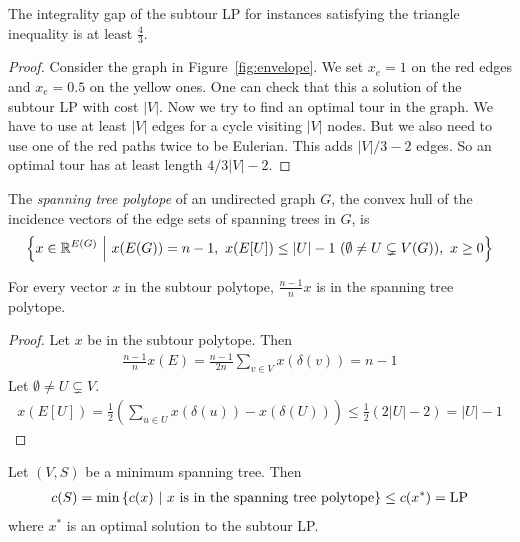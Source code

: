 \documentclass{skript}
\begin{document}
\begin{prop}
    The integrality gap of the subtour LP for instances satisfying the triangle inequality is at least $\frac43$.
\end{prop}
\begin{proof}
    Consider the graph in Figure~\ref{fig:envelope}.
    We set $x_e=1$ on the red edges and $x_e=0.5$ on the yellow ones.
    One can check that this a solution of the subtour LP with cost $|V|$.
    Now we try to find an optimal tour in the graph.
    We have to use at least $|V|$ edges for a cycle visiting $|V|$ nodes. 
    But we also need to use one of the red paths twice to be Eulerian.
    This adds $|V|/3 -2$ edges.
    So an optimal tour has at least length $4/3|V| - 2$.
\end{proof}


\begin{thm}\label{thm:mstpoly}
    The \emph{spanning tree polytope} of an undirected graph $G$, the convex hull of the incidence vectors of the edge sets of spanning trees in $G$, is
    \begin{align*}
        \left\{x\in \mathbb{R}^{E(G)} \ \middle|\  x(E(G)) = n-1,~ x(E[U]) \leq |U|-1 ~( \emptyset\neq U\subsetneq V(G)),~ x\geq 0\right\}
    \end{align*}
\end{thm}

\begin{cor}
    For every vector $x$ in the subtour polytope, $\frac{n-1}nx$ is in the spanning tree polytope.
\end{cor}
\begin{proof}
    Let $x$ be in the subtour polytope. Then
    \begin{align*}
        \frac{n-1}n x(E) = \frac{n-1}{2n} \sum_{v\in V} x(\delta(v)) = n-1
    \end{align*}
    Let $\emptyset \neq U\subsetneq V$. 
    \begin{align*}
        x(E[U]) = \frac12 \left(\sum_{u\in U} x(\delta(u)) - x(\delta(U))\right) \leq \frac 12 (2|U| - 2) = |U| -1 
    \end{align*}
\end{proof}

Let $(V,S)$ be a minimum spanning tree. 
Then
\begin{align*}
    c(S) = \min\left\{c(x)\ \middle|\  x \text{ is in the spanning tree polytope}\right\} \leq c(x^*) = \operatorname{LP}
\end{align*}
where $x^*$ is an optimal solution to the subtour LP.

\end{document}
